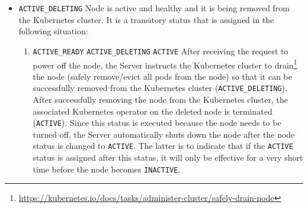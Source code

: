 \begin{itemize}
\begin{itemize}
      \item \texttt{ACTIVE\_DELETING}
        \newline
        Node is active and healthy and it is being removed from the Kubernetes
        cluster.
        \newline
        It is a transitory status that is assigned in the following situation:
        \begin{enumerate}
          \item \texttt{ACTIVE\_READY}  \texttt{ACTIVE\_DELETING}
             \texttt{ACTIVE}
            \newline
            After receiving the request to power off the node, the Server instructs
            the Kubernetes cluster to drain\footnote{\url{https://kubernetes.io/docs/tasks/administer-cluster/safely-drain-node}}
            the node (safely remove/evict all pods from the node) so that it can
            be successfully removed from the Kubernetes cluster (\texttt{ACTIVE\_DELETING}).
            After successfully removing the node from the Kubernetes cluster,
            the associated Kubernetes operator on the deleted node is terminated
            (\texttt{ACTIVE}).
            \newline
            Since this status is executed because the node needs to be turned
            off, the Server automatically shuts down the node after the node status
            is changed to \texttt{ACTIVE}. The latter is to indicate that if the
            \texttt{ACTIVE} status is assigned after this status, it will only be
            effective for a very short time before the node becomes \texttt{INACTIVE}.
        \end{enumerate}


\end{itemize}
\end{itemize}

